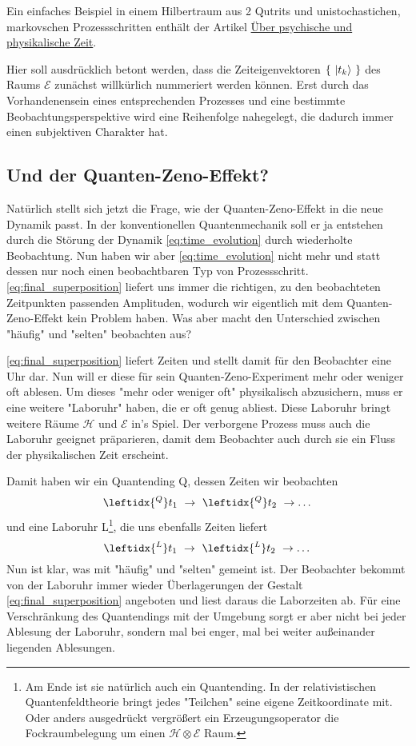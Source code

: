 \documentclass[12pt]{article}
\begin{document}
Ein einfaches Beispiel in einem Hilbertraum aus 2 Qutrits und unistochastichen, markovschen Prozessschritten enthält der Artikel \href{http://vermaschung.de/index.php?title=Warum_Panpsychismus%3F}{Über psychische und physikalische Zeit}. 

Hier soll ausdrücklich betont werden, dass die Zeiteigenvektoren $\{\ \ket{t_k}\ \}$ des Raums $\mathscr{E}$ zunächst willkürlich nummeriert werden können. Erst durch das Vorhandenensein eines entsprechenden Prozesses und eine bestimmte Beobachtungsperspektive wird eine Reihenfolge nahegelegt, die dadurch immer einen subjektiven Charakter hat.

\subsection{Und der Quanten-Zeno-Effekt?}

Natürlich stellt sich jetzt die Frage, wie der Quanten-Zeno-Effekt in die neue Dynamik passt. In der konventionellen Quantenmechanik soll er ja entstehen durch die Störung der Dynamik \eqref{eq:time_evolution} durch wiederholte Beobachtung. Nun haben wir aber \eqref{eq:time_evolution} nicht mehr und statt dessen nur noch einen beobachtbaren Typ von Prozessschritt. \eqref{eq:final_superposition} liefert uns immer die richtigen, zu den beobachteten Zeitpunkten passenden Amplituden, wodurch wir eigentlich mit dem Quanten-Zeno-Effekt kein Problem haben. Was aber macht den Unterschied zwischen "häufig" und "selten" beobachten aus?

\eqref{eq:final_superposition} liefert Zeiten und stellt damit für den Beobachter eine Uhr dar. Nun will er diese für sein Quanten-Zeno-Experiment mehr oder weniger oft ablesen. Um dieses "mehr oder weniger oft" physikalisch abzusichern, muss er eine weitere "Laboruhr" haben, die er oft genug abliest. Diese Laboruhr bringt weitere Räume $\mathscr{H}$ und $\mathscr{E}$ in's Spiel. Der verborgene Prozess muss auch die Laboruhr geeignet präparieren, damit dem Beobachter auch durch sie ein Fluss der physikalischen Zeit erscheint.

Damit haben wir ein Quantending Q, dessen Zeiten wir beobachten
\begin{equation*}
\leftidx{^Q}t_1\ \rightarrow\ \leftidx{^Q}t_2\ \rightarrow \dots
\end{equation*}
und eine Laboruhr L\footnote{Am Ende ist sie natürlich auch ein Quantending. In der relativistischen Quantenfeldtheorie bringt jedes "Teilchen" seine eigene Zeitkoordinate mit. Oder anders ausgedrückt vergrößert ein Erzeugungsoperator die Fockraumbelegung um einen $\mathscr{H} \otimes \mathscr{E}$ Raum.}, die uns ebenfalls Zeiten liefert
\begin{equation*}
\leftidx{^L}t_1\ \rightarrow\ \leftidx{^L}t_2 \ \rightarrow \dots
\end{equation*}
Nun ist klar, was mit "häufig" und "selten" gemeint ist. Der Beobachter bekommt von der Laboruhr immer wieder Überlagerungen der Gestalt \eqref{eq:final_superposition} angeboten und liest daraus die Laborzeiten ab. Für eine Verschränkung des Quantendings mit der Umgebung sorgt er aber nicht bei jeder Ablesung der Laboruhr, sondern mal bei enger, mal bei weiter außeinander liegenden Ablesungen. 
\end{document}
